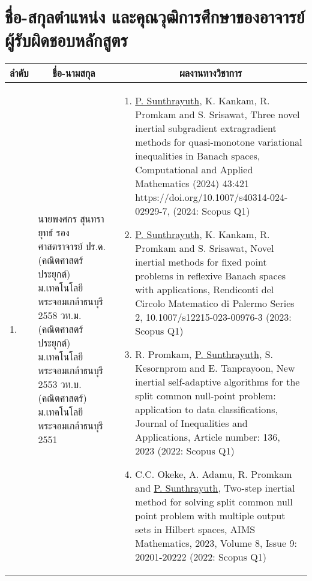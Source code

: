 \section{ชื่อ-สกุลตำแหน่ง และคุณวุฒิการศึกษาของอาจารย์ผู้รับผิดชอบหลักสูตร}
{\small
\begin{center}
\begin{longtable}{|p{}|p{}|p{}|}
	\hline
	\multicolumn{1}{|c|}{\textbf{ลำดับ}} &
	\multicolumn{1}{c|}{\textbf{ชื่อ-นามสกุล}} &
	\multicolumn{1}{c|}{\textbf{ผลงานทางวิชาการ}}\\
	\hline
\endhead	



1. &
นายพงศกร สุนทรายุทธ์ \newline 
รองศาสตราจารย์	\newline
ปร.ด.(คณิตศาสตร์ประยุกต์) \newline ม.เทคโนโลยีพระจอมเกล้าธนบุรี 2558 \newline
วท.ม.(คณิตศาสตร์ประยุกต์) \newline ม.เทคโนโลยีพระจอมเกล้าธนบุรี 2553  \newline
วท.บ.(คณิตศาสตร์) \newline ม.เทคโนโลยีพระจอมเกล้าธนบุรี 2551
&
\begin{enumerate}[series=tar]
	\item \underline{P. Sunthrayuth}, K. Kankam, R. Promkam and S. Srisawat, Three novel inertial subgradient extragradient methods for quasi-monotone variational inequalities in Banach spaces, Computational and Applied Mathematics (2024) 43:421 https://doi.org/10.1007/s40314-024-02929-7, (2024: Scopus Q1)
	\item \underline{P. Sunthrayuth}, K. Kankam, R. Promkam and S. Srisawat, Novel inertial methods for fixed point problems in reflexive Banach spaces with applications, Rendiconti del Circolo Matematico di Palermo Series 2, 10.1007/s12215-023-00976-3 (2023: Scopus Q1)
	\item R. Promkam, \underline{P. Sunthrayuth}, S. Kesornprom and E. Tanprayoon, New inertial self-adaptive algorithms for the split common null-point problem: application to data classifications, Journal of Inequalities and Applications, Article number: 136, 2023 (2022: Scopus Q1)
	\item C.C. Okeke, A. Adamu, R. Promkam and \underline{P. Sunthrayuth}, Two-step inertial method for solving split common null point problem with multiple output sets in Hilbert spaces, AIMS Mathematics, 2023, Volume 8, Issue 9: 20201-20222 (2022: Scopus Q1)

\end{enumerate}
\end{longtable}
\end{center}}
